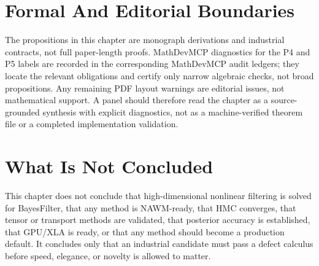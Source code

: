 \section{Formal And Editorial Boundaries}
\label{sec:bf-hd-formal-boundaries}

The propositions in this chapter are monograph derivations and industrial
contracts, not full paper-length proofs.  MathDevMCP diagnostics for the P4 and
P5 labels are recorded in the corresponding MathDevMCP audit ledgers; they
locate the relevant obligations and certify only narrow algebraic checks, not
broad propositions.  Any remaining PDF layout warnings are editorial issues,
not mathematical support.  A panel should therefore read the chapter as a
source-grounded synthesis with explicit diagnostics, not as a machine-verified
theorem file or a completed implementation validation.

\section{What Is Not Concluded}
\label{sec:bf-hd-synth-nonclaims}

This chapter does not conclude that high-dimensional nonlinear filtering is
solved for BayesFilter, that any method is NAWM-ready, that HMC converges, that
tensor or transport methods are validated, that posterior accuracy is
established, that GPU/XLA is ready, or that any method should become a
production default.  It concludes only that an industrial candidate must pass a
defect calculus before speed, elegance, or novelty is allowed to matter.
